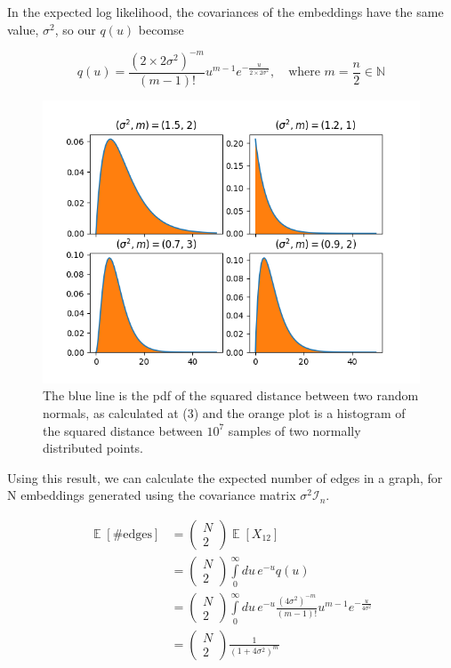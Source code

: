\documentclass{article}
\DeclareMathOperator{\EX}{\mathbb{E}}%
\newcommand{\mc}[1]{\mathcal{#1}}
\newcommand{\intlim}[2]{\int\limits_{#1}^{#2}}
\newcommand{\mbb}{\mathbb}
\begin{document}
\noindent
In the expected log likelihood, the covariances of the embeddings have the same value, $\sigma^2$, so our $q(u)$ becomse

\begin{equation}
    q(u) = \frac{(2 \times 2\sigma^2)^{-m}}{(m - 1)!} u^{m - 1}e^{-\frac{u}{2 \times 2\sigma^2}},\quad\text{where}\,\, m = \frac{n}{2} \in \mbb{N}
\end{equation}

\begin{figure}[ht]
    \includegraphics{sq_distance_pdf.png}
    \caption{The blue line is the pdf of the squared distance between two random normals, as calculated at (3) and the orange plot is a histogram of the squared distance between $10^7$ samples of two normally distributed points.}
\end{figure}

\noindent
Using this result, we can calculate the expected number of edges in a graph, for N embeddings generated using the covariance matrix $\sigma^2\mc{I}_n$.

\begin{align*}
    \EX[\text{\#edges}] &= \begin{pmatrix} N \\ 2 \end{pmatrix}\EX[X_{12}] \\
        &= \begin{pmatrix} N \\ 2 \end{pmatrix} \intlim{0}{\infty}du\, e^{-u} q(u) \\
        &= \begin{pmatrix} N \\ 2 \end{pmatrix} \intlim{0}{\infty}du\, e^{-u} \frac{(4\sigma^2)^{-m}}{(m - 1)!} u^{m - 1}e^{-\frac{u}{4\sigma^2}} \\
            &= \begin{pmatrix} N \\ 2 \end{pmatrix} \frac{1}{(1 + 4\sigma^2)^m} \\
\end{align*}
\end{document}
